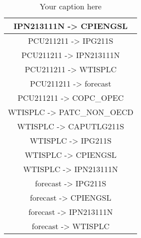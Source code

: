 \begin{table}[h]
\begin{scriptsize}
\begin{tabular}{c}
\hline
IPN213111N -> CPIENGSL \\
\hline
PCU211211 -> IPG211S \\
\hline
PCU211211 -> IPN213111N \\
\hline
PCU211211 -> WTISPLC \\
\hline
PCU211211 -> forecast \\
\hline
PCU211211 -> COPC_OPEC \\
\hline
WTISPLC -> PATC_NON_OECD \\
\hline
WTISPLC -> CAPUTLG211S \\
\hline
WTISPLC -> IPG211S \\
\hline
WTISPLC -> CPIENGSL \\
\hline
WTISPLC -> IPN213111N \\
\hline
forecast -> IPG211S \\
\hline
forecast -> CPIENGSL \\
\hline
forecast -> IPN213111N \\
\hline
forecast -> WTISPLC \\
\hline

\end{tabular}
\end{scriptsize}
\caption{Your caption here}
\end{table}